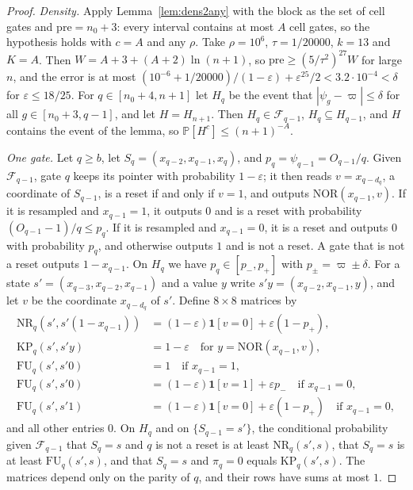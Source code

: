 \documentclass[11pt]{amsart}
\theoremstyle{definition}
\theoremstyle{remark}
\newcommand{\eps}{\varepsilon}
\newcommand{\NOR}{\mathrm{NOR}}
\newcommand{\PP}{\mathbb{P}}
\newcommand{\cF}{\mathcal{F}}
\begin{document}
\begin{proof}
\emph{Density.} Apply Lemma~\ref{lem:dens2any} with the block as the set of cell gates and
$\mathrm{pre}=n_0+3$: every interval contains at most $A$ cell gates, so the hypothesis holds with
$c=A$ and any $\rho$. Take $\rho=10^6$, $\tau=1/20000$, $k=13$ and $K=A$. Then
$W=A+3+(A+2)\ln(n+1)$, so $\mathrm{pre}\ge(5/\tau^2)^{27}W$ for large $n$, and the error is at most
$(10^{-6}+1/20000)/(1-\eps)+\eps^{25}/2<3.2\cdot10^{-4}<\delta$ for $\eps\le18/25$. For
$q\in[n_0+4,n+1]$ let $H_q$ be the event that $|\psi_g-\varpi|\le\delta$ for all
$g\in[n_0+3,q-1]$, and let $H=H_{n+1}$. Then $H_q\in\cF_{q-1}$, $H_q\subseteq H_{q-1}$, and $H$
contains the event of the lemma, so $\PP[H^c]\le(n+1)^{-A}$.

\emph{One gate.} Let $q\ge b$, let $S_q=(x_{q-2},x_{q-1},x_q)$, and $p_q=\psi_{q-1}=O_{q-1}/q$.
Given $\cF_{q-1}$, gate $q$ keeps its pointer with probability $1-\eps$; it then reads
$v=x_{q-d_q}$, a coordinate of $S_{q-1}$, is a reset if and only if $v=1$, and outputs
$\NOR(x_{q-1},v)$. If it is resampled and $x_{q-1}=1$, it outputs $0$ and is a reset with probability
$(O_{q-1}-1)/q\le p_q$. If it is resampled and $x_{q-1}=0$, it is a reset and outputs $0$ with
probability $p_q$, and otherwise outputs $1$ and is not a reset. A gate that is not a reset
outputs $1-x_{q-1}$. On $H_q$ we have $p_q\in[p_-,p_+]$ with $p_\pm=\varpi\pm\delta$. For a state
$s'=(x_{q-3},x_{q-2},x_{q-1})$ and a value $y$ write $s'y=(x_{q-2},x_{q-1},y)$, and let $v$ be the
coordinate $x_{q-d_q}$ of $s'$. Define $8\times8$ matrices by
\begin{align*}
\mathrm{NR}_q(s',s'(1-x_{q-1}))&=(1-\eps)\mathbf 1[v=0]+\eps(1-p_+),\\
\mathrm{KP}_q(s',s'y)&=1-\eps\quad\text{for }y=\NOR(x_{q-1},v),\\
\mathrm{FU}_q(s',s'0)&=1\quad\text{if }x_{q-1}=1,\\
\mathrm{FU}_q(s',s'0)&=(1-\eps)\mathbf 1[v=1]+\eps p_-\quad\text{if }x_{q-1}=0,\\
\mathrm{FU}_q(s',s'1)&=(1-\eps)\mathbf 1[v=0]+\eps(1-p_+)\quad\text{if }x_{q-1}=0,
\end{align*}
and all other entries $0$. On $H_q$ and on $\{S_{q-1}=s'\}$, the conditional probability given
$\cF_{q-1}$ that $S_q=s$ and $q$ is not a reset is at least $\mathrm{NR}_q(s',s)$, that $S_q=s$ is
at least $\mathrm{FU}_q(s',s)$, and that $S_q=s$ and $\pi_q=0$ equals $\mathrm{KP}_q(s',s)$. The
matrices depend only on the parity of $q$, and their rows have sums at most $1$.


\end{proof}
\end{document}
